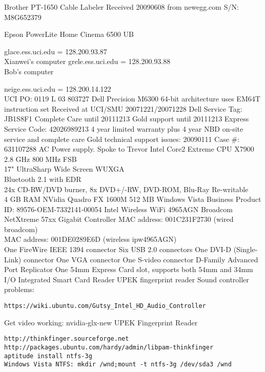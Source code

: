 \documentclass[12pt,twoside]{article}
\begin{document}
Brother PT-1650 Cable Labeler
Received 20090608 from newegg.com
S/N: M8G652379

Epson PowerLite Home Cinema 6500 UB

glace.ess.uci.edu = 128.200.93.87\\ Xianwei's computer
grele.ess.uci.edu = 128.200.93.88\\ Bob's computer

neige.ess.uci.edu = 128.200.14.122\\
UCI PO: 0119 L 03 803727
Dell Precision M6300
64-bit architecture uses EM64T instruction set
Received at UCI/SMU 20071221/20071228
Dell Service Tag: JB1S8F1
Complete Care until 20111213
Gold support until 20111213
Express Service Code: 42026989213
4 year limited warranty plus 4 year NBD on-site service and complete care
Gold technical support issues:
20090111 Case \#: 631107288 AC Power supply. Spoke to Trevor
Intel Core2 Extreme CPU X7900 2.8 GHz 800 MHz FSB\\
17" UltraSharp Wide Screen WUXGA\\
Bluetooth 2.1 with EDR\\
24x CD-RW/DVD burner, 8x DVD+/-RW, DVD-ROM, Blu-Ray Re-writable\\
4 GB RAM
NVidia Quadro FX 1600M 512 MB
Windows Vista Business Product ID: 89576-OEM-7332141-00054
Intel Wireless WiFi 4965AGN
Broadcom NetXtreme 57xx Gigabit Controller
MAC address: 001C231F2730 (wired broadcom) \\
MAC address: 001DE0289E6D (wireless ipw4965AGN) \\
One FireWire IEEE 1394 connector
Six USB 2.0 connectors
One DVI-D (Single-Link) connector 
One VGA connector
One S-video connector
D-Family Advanced Port Replicator
One 54mm Express Card slot, supports both 54mm and 34mm I/O
Integrated Smart Card Reader
UPEK fingerprint reader
Sound controller problems:
\begin{verbatim}
https://wiki.ubuntu.com/Gutsy_Intel_HD_Audio_Controller
\end{verbatim}
Get video working:
nvidia-glx-new
UPEK Fingerprint Reader \\
\begin{verbatim}
http://thinkfinger.sourceforge.net
http://packages.ubuntu.com/hardy/admin/libpam-thinkfinger
aptitude install ntfs-3g
Windows Vista NTFS: mkdir /wnd;mount -t ntfs-3g /dev/sda3 /wnd
\end{verbatim}
\end{document}
